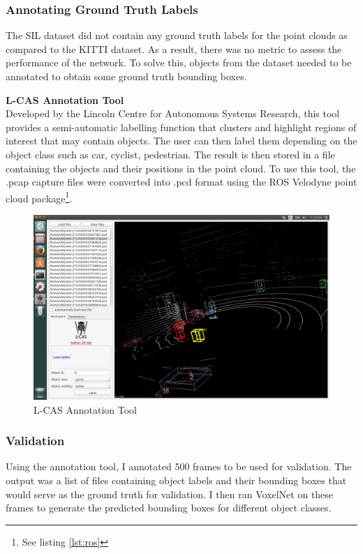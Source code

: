 \subsubsection*{Annotating Ground Truth Labels}
The SIL dataset did not contain any ground truth labels for the point clouds as compared to the KITTI dataset. As a result, there was no metric to assess the performance of the network. To solve this, objects from the dataset needed to be annotated to obtain some ground truth bounding boxes. 

\noindent
\textbf{L-CAS Annotation Tool} \\ 
Developed by the Lincoln Centre for Autonomous Systems Research, this tool provides a semi-automatic labelling function that clusters and highlight regions of interest that may contain objects. The user can then label them depending on the object class such as car, cyclist, pedestrian. The result is then stored in a file containing the objects and their positions in the point cloud. 
To use this tool, the .pcap capture files were converted into .pcd format using the 
ROS Velodyne point cloud package\footnote{See listing \ref{lst:ros}}. 

\begin{figure}[h]
	
	\includegraphics[width=\linewidth]{images/annot.png}
	\caption{L-CAS Annotation Tool}
	\label{fig:annot}
\end{figure}

\subsubsection{Validation}
Using the annotation tool, I annotated 500 frames to be used for validation. The output was a list of files containing object labels and their bounding boxes that would serve as the ground truth for validation. 
I then  ran VoxelNet on these frames to generate the predicted bounding boxes for different object classes.  


